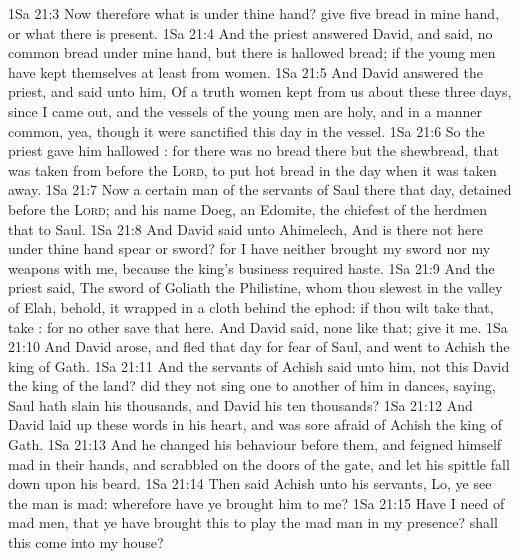 \vs 1Sa 21:3 Now therefore what is under thine hand? give  five  bread in mine hand, or what there is present.
\vs 1Sa 21:4 And the priest answered David, and said,  no common bread under mine hand, but there is hallowed bread; if the young men have kept themselves at least from women.
\vs 1Sa 21:5 And David answered the priest, and said unto him, Of a truth women  kept from us about these three days, since I came out, and the vessels of the young men are holy, and  in a manner common, yea, though it were sanctified this day in the vessel.
\vs 1Sa 21:6 So the priest gave him hallowed : for there was no bread there but the shewbread, that was taken from before the \textsc{Lord}, to put hot bread in the day when it was taken away.
\vs 1Sa 21:7 Now a certain man of the servants of Saul  there that day, detained before the \textsc{Lord}; and his name  Doeg, an Edomite, the chiefest of the herdmen that  to Saul.
\vs 1Sa 21:8 And David said unto Ahimelech, And is there not here under thine hand spear or sword? for I have neither brought my sword nor my weapons with me, because the king's business required haste.
\vs 1Sa 21:9 And the priest said, The sword of Goliath the Philistine, whom thou slewest in the valley of Elah, behold, it  wrapped in a cloth behind the ephod: if thou wilt take that, take : for  no other save that here. And David said,  none like that; give it me.
\vs 1Sa 21:10 And David arose, and fled that day for fear of Saul, and went to Achish the king of Gath.
\vs 1Sa 21:11 And the servants of Achish said unto him,  not this David the king of the land? did they not sing one to another of him in dances, saying, Saul hath slain his thousands, and David his ten thousands?
\vs 1Sa 21:12 And David laid up these words in his heart, and was sore afraid of Achish the king of Gath.
\vs 1Sa 21:13 And he changed his behaviour before them, and feigned himself mad in their hands, and scrabbled on the doors of the gate, and let his spittle fall down upon his beard.
\vs 1Sa 21:14 Then said Achish unto his servants, Lo, ye see the man is mad: wherefore  have ye brought him to me?
\vs 1Sa 21:15 Have I need of mad men, that ye have brought this  to play the mad man in my presence? shall this  come into my house?
